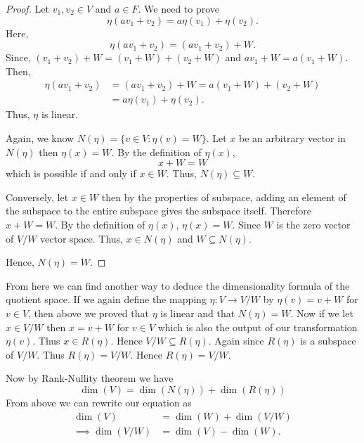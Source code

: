 \documentclass[12pt, a4paper]{article}
\theoremstyle{definition}
\theoremstyle{remark}
\begin{document}
	\begin{proof}
		Let $v_1, v_2 \in V$ and $a \in F$. We need to prove 
		\[ \eta(av_1 + v_2) = a\eta(v_1) + \eta(v_2). \]
		Here,
		\[ \eta(av_1+v_2) = (av_1+v_2)+W. \]
		Since, $(v_1+v_2)+W = (v_1+W) + (v_2+W)$ and $av_1+W = a(v_1+W)$. Then,
		\begin{align*}
			\eta(av_1+v_2) &= (av_1+v_2)+W = a(v_1+W) + (v_2+W) \\
			&= a\eta(v_1) + \eta(v_2).
		\end{align*}
		Thus, $\eta$ is linear.
		
		Again, we know $N(\eta) = \{v \in V : \eta(v) = W\}$. Let $x$ be an arbitrary vector in $N(\eta)$ then $\eta(x) = W$. By the definition of $\eta(x)$,
		\[ x+W = W \]
		which is possible if and only if $x \in W$. Thus, $N(\eta) \subseteq W$.
		
		Conversely, let $x \in W$ then by the properties of subspace, adding an element of the subspace to the entire subspace gives the subspace itself. Therefore $x+W = W$. By the definition of $\eta(x)$, $\eta(x) = W$. Since $W$ is the zero vector of $V/W$ vector space. Thus, $x \in N(\eta)$ and $W \subseteq N(\eta)$.
		
		Hence, $N(\eta) = W$.
	\end{proof}
	
	From here we can find another way to deduce the dimensionality formula of the quotient space. If we again define the mapping $\eta : V \to V/W$ by $\eta(v) = v+W$ for $v \in V$, then above we proved that $\eta$ is linear and that $N(\eta) = W$. Now if we let $x \in V/W$ then $x = v + W$ for $v \in V$ which is also the output of our transformation $\eta(v)$. Thus $x \in R(\eta)$. Hence $V/W \subseteq R(\eta)$. Again since $R(\eta)$ is a subspace of $V/W$. Thus $R(\eta) = V/W$. Hence $R(\eta) = V/W$.
	
	Now by Rank-Nullity theorem we have
	\[
	\dim(V) = \dim(N(\eta)) + \dim(R(\eta))
	\]
	From above we can rewrite our equation as
	\begin{align*}
		\dim(V) &= \dim(W) + \dim(V/W) \\
		\implies \dim(V/W) &= \dim(V) - \dim(W).
	\end{align*}
	
	\vspace{0.5cm}
	
\end{document}
